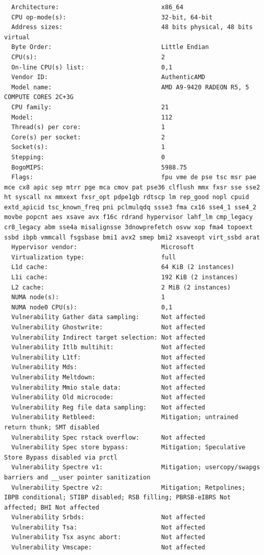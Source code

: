 \documentclass{article}
\begin{document}
\begin{verbatim}
  Architecture:                            x86_64
  CPU op-mode(s):                          32-bit, 64-bit
  Address sizes:                           48 bits physical, 48 bits virtual
  Byte Order:                              Little Endian
  CPU(s):                                  2
  On-line CPU(s) list:                     0,1
  Vendor ID:                               AuthenticAMD
  Model name:                              AMD A9-9420 RADEON R5, 5 COMPUTE CORES 2C+3G
  CPU family:                              21
  Model:                                   112
  Thread(s) per core:                      1
  Core(s) per socket:                      2
  Socket(s):                               1
  Stepping:                                0
  BogoMIPS:                                5988.75
  Flags:                                   fpu vme de pse tsc msr pae mce cx8 apic sep mtrr pge mca cmov pat pse36 clflush mmx fxsr sse sse2 ht syscall nx mmxext fxsr_opt pdpe1gb rdtscp lm rep_good nopl cpuid extd_apicid tsc_known_freq pni pclmulqdq ssse3 fma cx16 sse4_1 sse4_2 movbe popcnt aes xsave avx f16c rdrand hypervisor lahf_lm cmp_legacy cr8_legacy abm sse4a misalignsse 3dnowprefetch osvw xop fma4 topoext ssbd ibpb vmmcall fsgsbase bmi1 avx2 smep bmi2 xsaveopt virt_ssbd arat
  Hypervisor vendor:                       Microsoft
  Virtualization type:                     full
  L1d cache:                               64 KiB (2 instances)
  L1i cache:                               192 KiB (2 instances)
  L2 cache:                                2 MiB (2 instances)
  NUMA node(s):                            1
  NUMA node0 CPU(s):                       0,1
  Vulnerability Gather data sampling:      Not affected
  Vulnerability Ghostwrite:                Not affected
  Vulnerability Indirect target selection: Not affected
  Vulnerability Itlb multihit:             Not affected
  Vulnerability L1tf:                      Not affected
  Vulnerability Mds:                       Not affected
  Vulnerability Meltdown:                  Not affected
  Vulnerability Mmio stale data:           Not affected
  Vulnerability Old microcode:             Not affected
  Vulnerability Reg file data sampling:    Not affected
  Vulnerability Retbleed:                  Mitigation; untrained return thunk; SMT disabled
  Vulnerability Spec rstack overflow:      Not affected
  Vulnerability Spec store bypass:         Mitigation; Speculative Store Bypass disabled via prctl
  Vulnerability Spectre v1:                Mitigation; usercopy/swapgs barriers and __user pointer sanitization
  Vulnerability Spectre v2:                Mitigation; Retpolines; IBPB conditional; STIBP disabled; RSB filling; PBRSB-eIBRS Not affected; BHI Not affected
  Vulnerability Srbds:                     Not affected
  Vulnerability Tsa:                       Not affected
  Vulnerability Tsx async abort:           Not affected
  Vulnerability Vmscape:                   Not affected
\end{verbatim}
\end{document}
